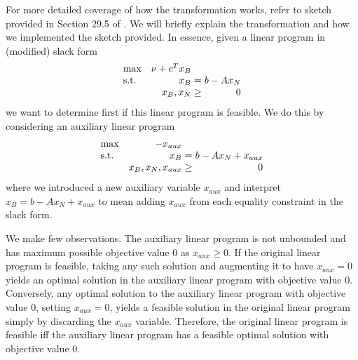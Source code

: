 \documentclass{article}
\begin{document}
For more detailed coverage of how the transformation works, refer to sketch provided in Section 29.5 of \cite{CLRS}. We will briefly explain the transformation and how we implemented the sketch provided. In essence, given a linear program in (modified) slack form
\begin{equation*}
\setlength\arraycolsep{1.5pt}
  \begin{array}{l@{\quad} r c r} 
    \max          & \nu + c^{T}x_B & & \\
    \mathrm{s.t.} &  x_B & = & b - Ax_N \\
                  & x_B, x_N & \geq &  0 \\
  \end{array}
\end{equation*}
we want to determine first if this linear program is feasible. We do this by considering an auxiliary linear program
\begin{equation*}
\setlength\arraycolsep{1.5pt}
  \begin{array}{l@{\quad} r c r} 
    \max          & -x_{aux} & & \\
    \mathrm{s.t.} &  x_B & = & b - Ax_N + x_{aux} \\
                  & x_B, x_N, x_{aux} & \geq &  0 \\
  \end{array}
\end{equation*}
where we introduced a new auxiliary variable $x_{aux}$ and interpret $x_B = b - Ax_N + x_{aux}$ to mean adding $x_{aux}$ from each equality constraint in the slack form. 

We make few observations. The auxiliary linear program is not unbounded and has maximum possible objective value $0$ as $x_{aux} \geq 0$. If the original linear program is feasible, taking any such solution and augmenting it to have $x_{aux} = 0$ yields an optimal solution in the auxiliary linear program with objective value $0$. Conversely, any optimal solution to the auxiliary linear program with objective value $0$, setting $x_{aux} = 0$, yields a feasible solution in the original linear program simply by discarding the $x_{aux}$ variable. Therefore, the original linear program is feasible iff the auxiliary linear program has a feasible optimal solution with objective value $0$. 
\end{document}
